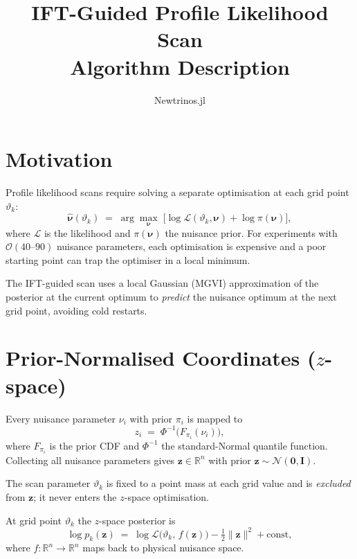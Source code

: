 \documentclass[11pt, a4paper]{article}
\title{\textbf{IFT-Guided Profile Likelihood Scan}\\[0.5em]
\large Algorithm Description}
\author{Newtrinos.jl}
\date{}
\newcommand{\nupar}{\bm{\nu}}
\newcommand{\zz}{\mathbf{z}}
\begin{document}
\maketitle

\section*{Motivation}

Profile likelihood scans require solving a separate optimisation at each
grid point $\vartheta_k$:
\begin{equation}
  \hat{\nupar}(\vartheta_k)
  \;=\; \arg\max_{\nupar}\;\bigl[\log\mathcal{L}(\vartheta_k, \nupar)
                                  + \log\pi(\nupar)\bigr],
\end{equation}
where $\mathcal{L}$ is the likelihood and $\pi(\nupar)$ the nuisance prior.
For experiments with $\mathcal{O}(40\text{--}90)$ nuisance parameters, each
optimisation is expensive and a poor starting point can trap the optimiser in a
local minimum.

The IFT-guided scan uses a local Gaussian (MGVI) approximation of the posterior
at the current optimum to \emph{predict} the nuisance optimum at the next grid
point, avoiding cold restarts.

\section{Prior-Normalised Coordinates ($z$-space)}

Every nuisance parameter $\nu_i$ with prior $\pi_i$ is mapped to
\begin{equation}
  z_i \;=\; \Phi^{-1}\!\bigl(F_{\pi_i}(\nu_i)\bigr),
\end{equation}
where $F_{\pi_i}$ is the prior CDF and $\Phi^{-1}$ the standard-Normal quantile
function.  Collecting all nuisance parameters gives
$\zz \in \mathbb{R}^n$ with prior $\zz \sim \mathcal{N}(\mathbf{0}, \mathbf{I})$.

The scan parameter $\vartheta_k$ is fixed to a point mass at each grid value and
is \emph{excluded} from $\zz$; it never enters the $z$-space optimisation.

At grid point $\vartheta_k$ the $z$-space posterior is
\begin{equation}
  \log p_k(\zz)
  \;=\; \log\mathcal{L}\!\bigl(\vartheta_k,\, f(\zz)\bigr)
        - \tfrac{1}{2}\|\zz\|^2 + \text{const},
\end{equation}
where $f:\mathbb{R}^n\!\to\!\mathbb{R}^n$ maps back to physical nuisance space.
\end{document}
